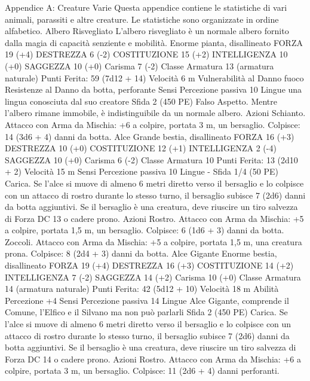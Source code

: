 \begin{multicols}{2}
Appendice A: Creature
Varie
Questa appendice contiene le statistiche di vari animali,
parassiti e altre creature. Le statistiche sono
organizzate in ordine alfabetico.
Albero Risvegliato
L’albero risvegliato è un normale albero fornito dalla
magia di capacità senziente e mobilità.
Enorme pianta, disallineato
FORZA 19 (+4)
DESTREZZA 6 (-2)
COSTITUZIONE 15 (+2)
INTELLIGENZA 10 (+0)
SAGGEZZA 10 (+0)
Carisma 7 (-2)
Classe Armatura 13 (armatura naturale)
\hspace*{0pt}\hfill{Punti Ferita}: 59 (7d12 + 14)
Velocità 6 m
Vulnerabilità al Danno fuoco
Resistenze al Danno da botta, perforante
Sensi Percezione passiva 10
Lingue una lingua conosciuta dal suo creatore
Sfida 2 (450 PE)
Falso Aspetto. Mentre l’albero rimane immobile, è
indistinguibile da un normale albero.
Azioni
Schianto. Attacco con Arma da Mischia: +6 a colpire, portata 3
m, un bersaglio.
Colpisce: 14 (3d6 + 4) danni da botta.
Alce
Grande bestia, disallineato
FORZA 16 (+3)
DESTREZZA 10 (+0)
COSTITUZIONE 12 (+1)
INTELLIGENZA 2 (-4)
SAGGEZZA 10 (+0)
Carisma 6 (-2)
Classe Armatura 10
\hspace*{0pt}\hfill{Punti Ferita}: 13 (2d10 + 2)
Velocità 15 m
Sensi Percezione passiva 10
Lingue -
Sfida 1/4 (50 PE)
Carica. Se l’alce si muove di almeno 6 metri diretto verso il
bersaglio e lo colpisce con un attacco di rostro durante lo stesso
turno, il bersaglio subisce 7 (2d6) danni da botta aggiuntivi.
Se il bersaglio è una creatura, deve riuscire un tiro salvezza di
Forza DC 13 o cadere prono.
Azioni
Rostro. Attacco con Arma da Mischia: +5 a colpire, portata 1,5
m, un bersaglio.
Colpisce: 6 (1d6 + 3) danni da botta.
Zoccoli. Attacco con Arma da Mischia: +5 a colpire, portata 1,5
m, una creatura prona.
Colpisce: 8 (2d4 + 3) danni da botta.
Alce Gigante
Enorme bestia, disallineato
FORZA 19 (+4)
DESTREZZA 16 (+3)
COSTITUZIONE 14 (+2)
INTELLIGENZA 7 (-2)
SAGGEZZA 14 (+2)
Carisma 10 (+0)
Classe Armatura 14 (armatura naturale)
\hspace*{0pt}\hfill{Punti Ferita}: 42 (5d12 + 10)
Velocità 18 m
Abilità Percezione +4
Sensi Percezione passiva 14
Lingue Alce Gigante, comprende il Comune, l’Elfico e il
Silvano ma non può parlarli
Sfida 2 (450 PE)
Carica. Se l’alce si muove di almeno 6 metri diretto verso il
bersaglio e lo colpisce con un attacco di rostro durante lo stesso
turno, il bersaglio subisce 7 (2d6) danni da botta aggiuntivi.
Se il bersaglio è una creatura, deve riuscire un tiro salvezza di
Forza DC 14 o cadere prono.
Azioni
Rostro. Attacco con Arma da Mischia: +6 a colpire, portata 3 m,
un bersaglio.
Colpisce: 11 (2d6 + 4) danni perforanti.

\end{multicols}
